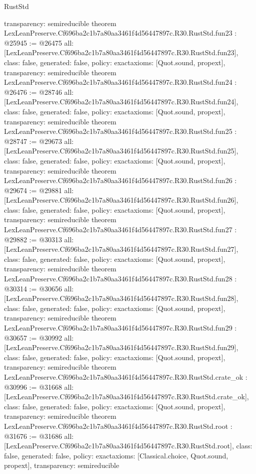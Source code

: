 \begin{lexlean}{RustStd}
\begin{coremodule}
{  transparency: semireducible
}
theorem LexLeanPreserve.Cf696ba2c1b7a80aa3461f4d56447897c.R30.RustStd.fun23 : @25945 := @26475 {
  all: [LexLeanPreserve.Cf696ba2c1b7a80aa3461f4d56447897c.R30.RustStd.fun23],
  class: false,
  generated: false,
  policy: exact{axioms: [Quot.sound, propext]},
  transparency: semireducible
}
theorem LexLeanPreserve.Cf696ba2c1b7a80aa3461f4d56447897c.R30.RustStd.fun24 : @26476 := @28746 {
  all: [LexLeanPreserve.Cf696ba2c1b7a80aa3461f4d56447897c.R30.RustStd.fun24],
  class: false,
  generated: false,
  policy: exact{axioms: [Quot.sound, propext]},
  transparency: semireducible
}
theorem LexLeanPreserve.Cf696ba2c1b7a80aa3461f4d56447897c.R30.RustStd.fun25 : @28747 := @29673 {
  all: [LexLeanPreserve.Cf696ba2c1b7a80aa3461f4d56447897c.R30.RustStd.fun25],
  class: false,
  generated: false,
  policy: exact{axioms: [Quot.sound, propext]},
  transparency: semireducible
}
theorem LexLeanPreserve.Cf696ba2c1b7a80aa3461f4d56447897c.R30.RustStd.fun26 : @29674 := @29881 {
  all: [LexLeanPreserve.Cf696ba2c1b7a80aa3461f4d56447897c.R30.RustStd.fun26],
  class: false,
  generated: false,
  policy: exact{axioms: [Quot.sound, propext]},
  transparency: semireducible
}
theorem LexLeanPreserve.Cf696ba2c1b7a80aa3461f4d56447897c.R30.RustStd.fun27 : @29882 := @30313 {
  all: [LexLeanPreserve.Cf696ba2c1b7a80aa3461f4d56447897c.R30.RustStd.fun27],
  class: false,
  generated: false,
  policy: exact{axioms: [Quot.sound, propext]},
  transparency: semireducible
}
theorem LexLeanPreserve.Cf696ba2c1b7a80aa3461f4d56447897c.R30.RustStd.fun28 : @30314 := @30656 {
  all: [LexLeanPreserve.Cf696ba2c1b7a80aa3461f4d56447897c.R30.RustStd.fun28],
  class: false,
  generated: false,
  policy: exact{axioms: [Quot.sound, propext]},
  transparency: semireducible
}
theorem LexLeanPreserve.Cf696ba2c1b7a80aa3461f4d56447897c.R30.RustStd.fun29 : @30657 := @30992 {
  all: [LexLeanPreserve.Cf696ba2c1b7a80aa3461f4d56447897c.R30.RustStd.fun29],
  class: false,
  generated: false,
  policy: exact{axioms: [Quot.sound, propext]},
  transparency: semireducible
}
theorem LexLeanPreserve.Cf696ba2c1b7a80aa3461f4d56447897c.R30.RustStd.crate_ok : @30996 := @31668 {
  all: [LexLeanPreserve.Cf696ba2c1b7a80aa3461f4d56447897c.R30.RustStd.crate_ok],
  class: false,
  generated: false,
  policy: exact{axioms: [Quot.sound, propext]},
  transparency: semireducible
}
theorem LexLeanPreserve.Cf696ba2c1b7a80aa3461f4d56447897c.R30.RustStd.root : @31676 := @31686 {
  all: [LexLeanPreserve.Cf696ba2c1b7a80aa3461f4d56447897c.R30.RustStd.root],
  class: false,
  generated: false,
  policy: exact{axioms: [Classical.choice, Quot.sound, propext]},
  transparency: semireducible
}


\end{coremodule}
\end{lexlean}
